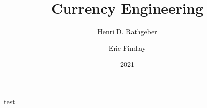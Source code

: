 \documentclass[13pt,a4paper,draft]{article}
\begin{document}
\title{Currency Engineering}
\author{Henri D. Rathgeber \and Eric Findlay}
\date{2021}
\maketitle

test
\end{document}
